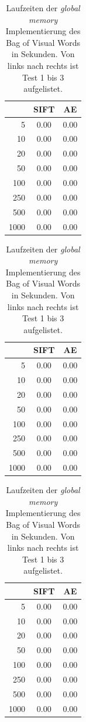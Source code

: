 \begin{table}
    \hfill
    \begin{tabular}[t]{| r | c | c |}
    \hline
	     & SIFT & AE \\ \hline    
    5    & 0.00 & 0.00 \\ \hline
    10   & 0.00 & 0.00 \\ \hline
    20   & 0.00 & 0.00 \\ \hline
    50   & 0.00 & 0.00 \\ \hline
    100  & 0.00 & 0.00 \\ \hline
	250  & 0.00 & 0.00 \\ \hline
	500  & 0.00 & 0.00 \\ \hline
	1000 & 0.00 & 0.00 \\ \hline  
    \end{tabular}
    \hfill
    \begin{tabular}[t]{| r | c | c |}
    \hline
	     & SIFT & AE \\ \hline    
    5    & 0.00 & 0.00 \\ \hline
    10   & 0.00 & 0.00 \\ \hline
    20   & 0.00 & 0.00 \\ \hline
    50   & 0.00 & 0.00 \\ \hline
    100  & 0.00 & 0.00 \\ \hline
	250  & 0.00 & 0.00 \\ \hline
	500  & 0.00 & 0.00 \\ \hline
	1000 & 0.00 & 0.00 \\ \hline    
    \end{tabular}
    \hfill
    \begin{tabular}[t]{| r | c | c |}
    \hline
	     & SIFT & AE \\ \hline    
    5    & 0.00 & 0.00 \\ \hline
    10   & 0.00 & 0.00 \\ \hline
    20   & 0.00 & 0.00 \\ \hline
    50   & 0.00 & 0.00 \\ \hline
    100  & 0.00 & 0.00 \\ \hline
	250  & 0.00 & 0.00 \\ \hline
	500  & 0.00 & 0.00 \\ \hline
	1000 & 0.00 & 0.00 \\ \hline    
    \end{tabular}
    \hfill
	\caption{Laufzeiten der \textit{global memory} Implementierung des Bag of Visual Words in Sekunden. Von links nach rechts ist Test 1 bis 3 aufgelistet.}
\end{table}

